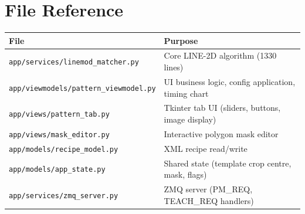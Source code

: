 \documentclass[11pt,a4paper]{article}
\begin{document}
\section{File Reference}
\begin{longtable}{p{5.5cm}p{8cm}}\toprule
\textbf{File} & \textbf{Purpose}\\\midrule
\texttt{app/services/linemod\_matcher.py} & Core LINE-2D algorithm (1330 lines)\\
\texttt{app/viewmodels/pattern\_viewmodel.py} & UI business logic, config application, timing chart\\
\texttt{app/views/pattern\_tab.py} & Tkinter tab UI (sliders, buttons, image display)\\
\texttt{app/views/mask\_editor.py} & Interactive polygon mask editor\\
\texttt{app/models/recipe\_model.py} & XML recipe read/write\\
\texttt{app/models/app\_state.py} & Shared state (template crop centre, mask, flags)\\
\texttt{app/services/zmq\_server.py} & ZMQ server (PM\_REQ, TEACH\_REQ handlers)\\\bottomrule
\end{longtable}
\end{document}
